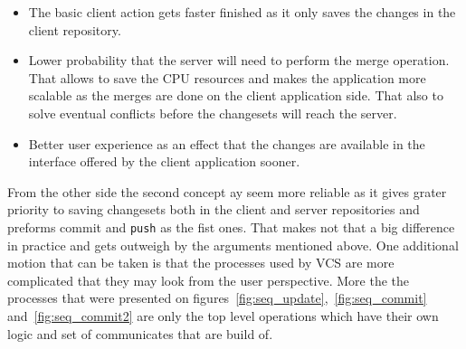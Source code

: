 \begin{itemize}
\item{The basic client action gets faster finished as it only saves the changes in the client repository.}
\item{Lower probability that the server will need to perform the merge operation. That allows to save the CPU resources and makes the application more scalable as the merges are done on the client application side. That also to solve eventual conflicts before the changesets will reach the server.}
\item{Better user experience as an effect that the changes are available in the interface offered by the client application sooner.}
\end{itemize}
From the other side the second concept ay seem more reliable as it gives grater priority to saving changesets both in the client and server repositories and preforms commit and \texttt{push} as the fist ones. That makes not that a big difference in practice and gets outweigh by the arguments mentioned above. One additional motion that can be taken is that the processes used by VCS are more complicated that they may look from the user perspective. More the the processes that were presented on figures~\ref{fig:seq_update},~\ref{fig:seq_commit} and~\ref{fig:seq_commit2} are only the top level operations which have their own logic and set of communicates that are build of.

